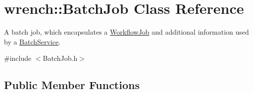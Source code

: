 \hypertarget{classwrench_1_1_batch_job}{}\section{wrench\+:\+:Batch\+Job Class Reference}
\label{classwrench_1_1_batch_job}


A batch job, which encapsulates a \hyperlink{classwrench_1_1_workflow_job}{Workflow\+Job} and additional information used by a \hyperlink{classwrench_1_1_batch_service}{Batch\+Service}.  




{\ttfamily \#include $<$Batch\+Job.\+h$>$}

\subsection*{Public Member Functions}
